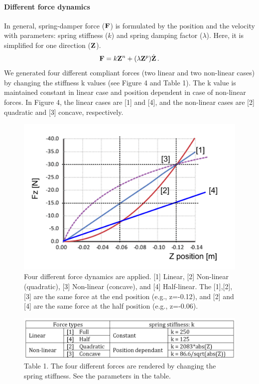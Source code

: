 \paragraph{Different force dynamics}
In general, spring-damper force ($\mathbf{F}$) is formulated by the position and the
velocity with parameters: spring stiffness ($k$) and spring damping factor
($\lambda$).  Here, it is simplified for one direction ($\mathbf{Z}$).
%
\begin{equation}
  \mathbf{F} = k \mathbf{Z}^n + (\lambda \mathbf{Z}^p) \dot{\mathbf{Z}} \, .
\end{equation}
%
We generated four different compliant forces (two linear and two non-linear cases) by changing the stiffness k values (see Figure 4 and Table 1). The k value is maintained constant in linear case and position dependent in case of non-linear forces. In Figure 4, the linear cases are [1] and [4], and the non-linear cases are [2] quadratic and [3] concave, respectively.
\begin{figure}
  \centering
  \includegraphics[scale=0.5]{Chie/figs/Figure4.png}
  \caption{Four different force dynamics are applied. [1] Linear, [2] Non-linear (quadratic), [3] Non-linear (concave), and [4] Half-linear. The [1],[2],[3] are the same force at the end position (e.g., z=-0.12), and [2] and [4] are the same force at the half position  (e.g., z=-0.06).}
  \label{forcedyn}
\end{figure}

\begin{figure}
  \centering
  \includegraphics[scale=0.4]{Chie/figs/Table1.png}
  \caption{Table 1. The four different forces are rendered by changing the spring stiffness. See the parameters in the table.}
  \label{Table1}
\end{figure}

